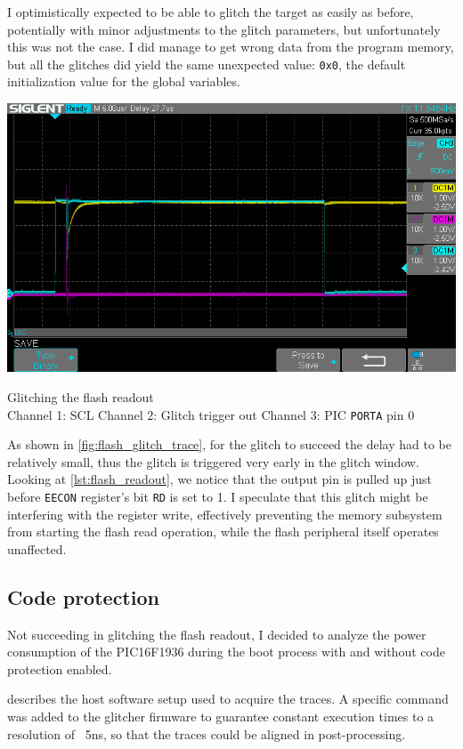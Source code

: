 \documentclass[a4paper,english,twoside,10pt]{article}
\begin{document}
I optimistically expected to be able to glitch the target as easily as before, potentially with minor adjustments to the glitch parameters, but unfortunately this was not the case. I did manage to get wrong data from the program memory, but all the glitches did yield the same unexpected value: \texttt{0x0}, the default initialization value for the global variables.

\begin{center}
	\captionsetup{type=figure}
	\includegraphics[width=.75\textwidth]{flash_glitches/scope_trace.png}
	\caption{Glitching the flash readout\\Channel 1: SCL \quad Channel 2: Glitch trigger out \quad Channel 3: PIC \texttt{PORTA} pin 0}
	\label{fig:flash_glitch_trace}
\end{center}

As shown in \cref{fig:flash_glitch_trace}, for the glitch to succeed the delay had to be relatively small, thus the glitch is triggered very early in the glitch window. Looking at \cref{lst:flash_readout}, we notice that the output pin is pulled up just before \texttt{EECON} register's bit \texttt{RD} is set to 1. I speculate that this glitch might be interfering with the register write, effectively preventing the memory subsystem from starting the flash read operation, while the flash peripheral itself operates unaffected.

\subsection{Code protection}\label{sect:codeprotection}
Not succeeding in glitching the flash readout, I decided to analyze the power consumption of the PIC16F1936 during the boot process with and without code protection enabled.

 describes the host software setup used to acquire the traces. A specific command was added to the glitcher firmware to guarantee constant execution times to a resolution of ~5ns, so that the traces could be aligned in post-processing.
\end{document}

